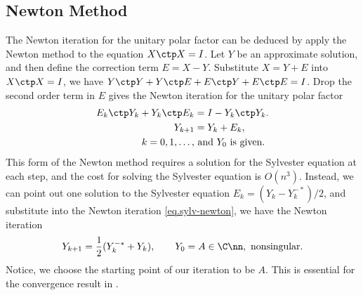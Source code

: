 \documentclass{article}
\numberwithin{equation}{section} %
\begin{document}
\subsection{Newton Method}
The Newton iteration for the unitary polar factor can be deduced by apply
the Newton method to the equation $X\ctp X = I$.
Let $Y$ be an approximate solution, and then define the correction term
$E = X - Y$. Substitute $X = Y + E$ into $X\ctp X = I$, we have
$Y\ctp Y + Y\ctp E + E\ctp Y + E\ctp E = I$.
Drop the second order term in $E$
gives the Newton iteration for the unitary polar factor
\begin{equation}
  \label{eq.sylv-newton}
  \begin{aligned}
    E_{k}\ctp Y_{k} + Y_{k}\ctp E_{k} & = I - Y_{k}\ctp Y_{k}. \\
    Y_{k+1} & = Y_{k} + E_{k},  \\
    k = 0,1,\dots, &\ \text{and $Y_{0}$ is given}.
  \end{aligned}
\end{equation}
This form of the Newton method requires a solution for the
Sylvester equation at each step, and the cost for solving the Sylvester
equation is $O(n^{3})$. Instead, we can point out one solution to the
Sylvester equation $E_{k} = (Y_{k} - Y_{k}^{-*})/2$, and substitute into
the Newton iteration \eqref{eq.sylv-newton}, we have the Newton iteration
\begin{equation}\label{eq.cls-newton}
  Y_{k+1} = \frac{1}{2}(Y_{k}^{-*} + Y_{k}), \qquad Y_{0} = A \in \C\nn,
  \text{ nonsingular}.
\end{equation}
Notice, we choose the starting point of our iteration to be $A$. This is
essential for the convergence result in . 
\end{document}
